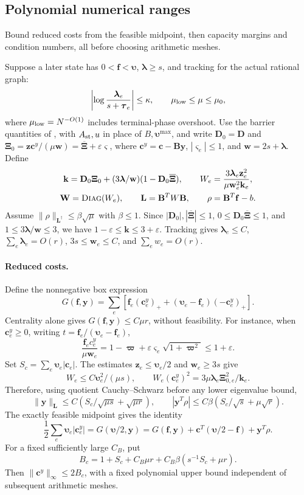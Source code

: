 \documentclass[11pt]{article}
\theoremstyle{remark}
\newcommand{\BB}{\mathbf B}
\newcommand{\LL}{\mathbf L}
\newcommand{\cc}{\mathbf c}
\newcommand{\ff}{\mathbf f}
\newcommand{\llambda}{\boldsymbol{\lambda}}
\newcommand{\ttau}{\boldsymbol{\tau}}
\newcommand{\ww}{\mathbf w}
\newcommand{\yy}{\mathbf y}
\newcommand{\zz}{\mathbf z}
\newcommand{\vvs}{\boldsymbol{\varsigma}}
\newcommand{\vvp}{\boldsymbol{\varpi}}
\newcommand{\vvu}{\boldsymbol{\upsilon}}
\newcommand{\XXi}{\boldsymbol{\Xi}}
\newcommand{\XXibar}{\overline{\boldsymbol{\Xi}}}
\newcommand{\DD}{\mathbf D}
\newcommand{\WW}{\mathbf W}
\newcommand{\kk}{\mathbf k}
\newcommand{\diag}{\textsc{Diag}}
\newcommand{\norm}[1]{\lVert#1\rVert}
\begin{document}
\subsection{Polynomial numerical ranges}
\label{sec:ram30-polynomial-ranges}

Bound reduced costs from the feasible midpoint, then capacity margins and
condition numbers, all before choosing arithmetic meshes.

Suppose a later state has $0<\ff<\vvu$, $\llambda\ge s$, and tracking for the actual
rational graph:
\[
 \left|\log\frac{\llambda_e}{s+\ttau_e}\right|\le\kappa,
 \qquad
 \mu_{\rm low}\le\mu\le\mu_0 ,
\]
where $\mu_{\rm low}=N^{-O(1)}$ includes terminal-phase overshoot.
Use the barrier quantities of , with $A_{\rm st},u$ in place of
$B,\vvu^{\max}$, and write $\DD_0=\DD$ and $\XXi_0=\zz\cc^y/(\mu\ww)=\XXibar+\varepsilon\vvs$, where
$\cc^y=\cc-\BB\yy$, $|\vvs_e|\le1$, and $\ww=2s+\llambda$.
Define
\[
 \begin{gathered}
 \kk=\DD_0\XXi_0+(3\llambda/\ww)(1-\DD_0\XXibar),\qquad
 W_e=\frac{3\llambda_e \zz_e^2}{\mu \ww_e^2\kk_e},\\
 \WW=\diag(W_e),\qquad
 \LL=\BB^TW\BB,\qquad \rho=\BB^T\ff-b .
 \end{gathered}
\]
Assume $\norm{\rho}_{\LL^\dagger}\le\beta\sqrt\mu$ with $\beta\le1$.
Since $|\DD_0|,|\XXibar|\le1$, $0\le \DD_0\XXibar\le1$, and $1\le3\llambda/\ww\le3$, we have
$1-\varepsilon\le \kk\le3+\varepsilon$.
Tracking gives $\llambda_e\le C$, $\sum_e\llambda_e=O(r)$, $3s\le \ww_e\le C$, and
$\sum_ew_e=O(r)$.

\paragraph{Reduced costs.}
Define the nonnegative box expression
\[
 G(\ff,\yy)=\sum_e\left[\ff_e(\cc_e^y)_+
                      +(\vvu_e-\ff_e)(-\cc_e^y)_+\right].
\]
Centrality alone gives $G(\ff,\yy)\le C\mu r$, without feasibility.
For instance, when $\cc_e^y\ge0$, writing $t=\ff_e/(\vvu_e-\ff_e)$,
\[
 \frac{\ff_ec_e^y}{\mu \ww_e}
   =1-\vvp+\varepsilon \vvs_e\sqrt{1+\vvp^2}\le1+\varepsilon .
\]
Set $S_c=\sum_e\vvu_e|\cc_e|$.
The estimates $\zz_e\le \vvu_e/2$ and $\ww_e\ge3s$ give
\[
 W_e\le C \vvu_e^2/(\mu s),\qquad
 W_e(\cc_e^y)^2=3\mu\llambda_e \XXi_{0,e}^2/\kk_e .
\]
Therefore, using quotient Cauchy--Schwarz before any lower eigenvalue bound,
\[
 \norm{\yy}_{\LL}
 \le C\left(S_c/\sqrt{\mu s}+\sqrt{\mu r}\right),\qquad
 |\yy^T\rho|\le C\beta(S_c/\sqrt s+\mu\sqrt r).
\]
The exactly feasible midpoint gives the identity
\[
 \frac12\sum_e\vvu_e|\cc_e^y|
   =G(\vvu/2,\yy)
   =G(\ff,\yy)+\cc^T(\vvu/2-\ff)+\yy^T\rho .
\]
For a fixed sufficiently large $C_B$, put
\[
 B_c=1+S_c+C_B\mu r+
                  C_B\beta(s^{-1}S_c+\mu r).
\]
Then $\norm{\cc^y}_\infty\le2B_c$, with a fixed polynomial upper bound independent
of subsequent arithmetic meshes.
\end{document}
